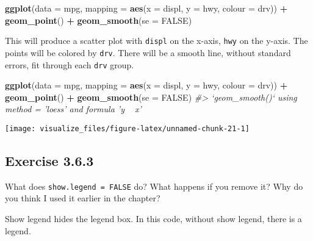 \documentclass[]{book}
\newenvironment{Shaded}{\begin{snugshade}}{\end{snugshade}}
\newcommand{\CommentTok}[1]{\textcolor[rgb]{0.56,0.35,0.01}{\textit{#1}}}
\newcommand{\DataTypeTok}[1]{\textcolor[rgb]{0.13,0.29,0.53}{#1}}
\newcommand{\KeywordTok}[1]{\textcolor[rgb]{0.13,0.29,0.53}{\textbf{#1}}}
\newcommand{\NormalTok}[1]{#1}
\newcommand{\OperatorTok}[1]{\textcolor[rgb]{0.81,0.36,0.00}{\textbf{#1}}}
\newcommand{\OtherTok}[1]{\textcolor[rgb]{0.56,0.35,0.01}{#1}}
\newcommand{\StringTok}[1]{\textcolor[rgb]{0.31,0.60,0.02}{#1}}
\theoremstyle{plain}
\theoremstyle{remark}
\theoremstyle{definition}
\theoremstyle{definition}
\theoremstyle{definition}
\theoremstyle{remark}
\begin{document}
\begin{Shaded}
\begin{Highlighting}[]
\KeywordTok{ggplot}\NormalTok{(}\DataTypeTok{data =}\NormalTok{ mpg, }\DataTypeTok{mapping =} \KeywordTok{aes}\NormalTok{(}\DataTypeTok{x =}\NormalTok{ displ, }\DataTypeTok{y =}\NormalTok{ hwy, }\DataTypeTok{colour =}\NormalTok{ drv)) }\OperatorTok{+}
\StringTok{  }\KeywordTok{geom_point}\NormalTok{() }\OperatorTok{+}
\StringTok{  }\KeywordTok{geom_smooth}\NormalTok{(}\DataTypeTok{se =} \OtherTok{FALSE}\NormalTok{)}
\end{Highlighting}
\end{Shaded}

This will produce a scatter plot with \texttt{displ} on the x-axis,
\texttt{hwy} on the y-axis. The points will be colored by \texttt{drv}.
There will be a smooth line, without standard errors, fit through each
\texttt{drv} group.

\begin{Shaded}
\begin{Highlighting}[]
\KeywordTok{ggplot}\NormalTok{(}\DataTypeTok{data =}\NormalTok{ mpg, }\DataTypeTok{mapping =} \KeywordTok{aes}\NormalTok{(}\DataTypeTok{x =}\NormalTok{ displ, }\DataTypeTok{y =}\NormalTok{ hwy, }\DataTypeTok{colour =}\NormalTok{ drv)) }\OperatorTok{+}
\StringTok{  }\KeywordTok{geom_point}\NormalTok{() }\OperatorTok{+}
\StringTok{  }\KeywordTok{geom_smooth}\NormalTok{(}\DataTypeTok{se =} \OtherTok{FALSE}\NormalTok{)}
\CommentTok{#> `geom_smooth()` using method = 'loess' and formula 'y ~ x'}
\end{Highlighting}
\end{Shaded}

\begin{center}\texttt{[image: visualize\_files/figure-latex/unnamed-chunk-21-1]} \end{center}

\hypertarget{exercise-3.6.3}{%
\subsection*{\texorpdfstring{Exercise
{3.6.3}}{Exercise 3.6.3}}\label{exercise-3.6.3}}

What does \texttt{show.legend\ =\ FALSE} do? What happens if you remove
it? Why do you think I used it earlier in the chapter?

Show legend hides the legend box. In this code, without show legend,
there is a legend.
\end{document}

